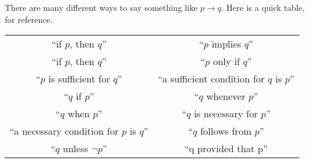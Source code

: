 \documentclass[../main.tex]{subfiles}
\begin{document}
There are many different ways to say something like $p\to q$. Here is a quick table, for reference.
\begin{center}
    \begin{tabular}{ c|c } 
    ``if $p$, then $q$'' & ``$p$ implies $q$'' \\
    ``if $p$, then $q$'' & ``$p$ only if $q$'' \\
    ``$p$ is sufficient for $q$'' & ``a sufficient condition for $q$ is $p$'' \\
    ``$q$ if $p$'' & ``$q$ whenever $p$'' \\
    ``$q$ when $p$'' &  ``$q$ is necessary for $p$'' \\
    ``a necessary condition for $p$ is $q$'' & “$q$ follows from $p$'' \\
    ``$q$ unless $\lnot p$'' & ``q provided that p''
    \end{tabular}
\end{center}
\end{document}
